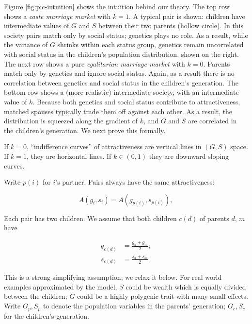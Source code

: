 \documentclass[
]{article}
\begin{document}
Figure \ref{fig:pic-intuition} shows the intuition behind our theory.
The top row shows a \emph{caste marriage market} with \(k = 1\). A typical pair
is shown: children have intermediate values of \(G\) and \(S\) between their
two parents (hollow circle). In this society pairs match only by social
status; genetics plays no role. As a result, while the variance of \(G\)
shrinks within each status group, genetics remain uncorrelated with
social status in the children's population distribution, shown on the
right. The next row shows a pure \emph{egalitarian marriage market} with
\(k = 0\). Parents match only by genetics and ignore social status. Again,
as a result there is no correlation between genetics and social status
in the children's generation. The bottom row shows a (more realistic)
intermediate society, with an intermediate value of \(k\). Because both
genetics and social status contribute to attractiveness, matched spouses
typically trade them off against each other. As a result, the
distribution is squeezed along the gradient of \(k\), and \(G\) and \(S\) are
correlated in the children's generation. We next prove this formally.

If \(k = 0\), ``indifference curves'' of attractiveness are vertical lines
in \((G, S)\) space. If \(k = 1\), they are horizontal lines. If
\(k \in (0,1)\) they are downward sloping curves.

Write \(p(i)\) for \(i\)'s partner. Pairs always have the same
attractiveness:

\begin{equation}
A(g_{i},s_{i}) = A(g_{p(i)},s_{p(i)}),
\label{eq:same-A}
\end{equation}

Each pair has two children. We assume that both children \(c(d)\) of
parents \(d\), \(m\) have

\begin{align}
g_{c(d)} & =\frac{g_{d}+g_{m}}{2};\label{eq:children-average}\\
s_{c(d)} & =\frac{s_{d}+s_{m}}{2}.\nonumber 
\end{align}

This is a strong simplifying assumption; we relax it below. For real
world examples approximated by the model, \(S\) could be wealth which is
equally divided between the children; \(G\) could be a highly polygenic
trait with many small effects. Write \(G_{p}, S_{p}\) to denote the
population variables in the parents' generation; \(G_{c}, S_{c}\) for the
children's generation.
\end{document}
